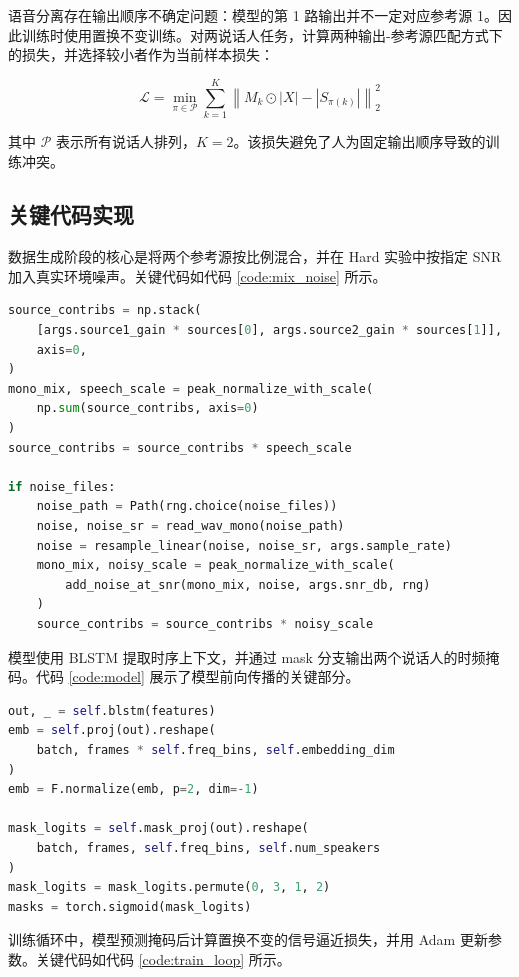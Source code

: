 语音分离存在输出顺序不确定问题：模型的第 1 路输出并不一定对应参考源 1。因此训练时使用置换不变训练\cite{yu2017pit}。对两说话人任务，计算两种输出-参考源匹配方式下的损失，并选择较小者作为当前样本损失：

\[
\mathcal{L} = \min_{\pi \in \mathcal{P}}
\sum_{k=1}^{K}
\left\|
M_k \odot |X| - |S_{\pi(k)}|
\right\|_2^2
\]

其中 $\mathcal{P}$ 表示所有说话人排列，$K=2$。该损失避免了人为固定输出顺序导致的训练冲突。

\subsection{关键代码实现}

数据生成阶段的核心是将两个参考源按比例混合，并在 Hard 实验中按指定 SNR 加入真实环境噪声。关键代码如代码 \ref{code:mix_noise} 所示。

\begin{lstlisting}[language=Python, caption={混合语音和噪声加入逻辑}, label={code:mix_noise}]
source_contribs = np.stack(
    [args.source1_gain * sources[0], args.source2_gain * sources[1]],
    axis=0,
)
mono_mix, speech_scale = peak_normalize_with_scale(
    np.sum(source_contribs, axis=0)
)
source_contribs = source_contribs * speech_scale

if noise_files:
    noise_path = Path(rng.choice(noise_files))
    noise, noise_sr = read_wav_mono(noise_path)
    noise = resample_linear(noise, noise_sr, args.sample_rate)
    mono_mix, noisy_scale = peak_normalize_with_scale(
        add_noise_at_snr(mono_mix, noise, args.snr_db, rng)
    )
    source_contribs = source_contribs * noisy_scale
\end{lstlisting}

模型使用 BLSTM 提取时序上下文，并通过 mask 分支输出两个说话人的时频掩码。代码 \ref{code:model} 展示了模型前向传播的关键部分。

\begin{lstlisting}[language=Python, caption={BLSTM 软掩码模型前向传播}, label={code:model}]
out, _ = self.blstm(features)
emb = self.proj(out).reshape(
    batch, frames * self.freq_bins, self.embedding_dim
)
emb = F.normalize(emb, p=2, dim=-1)

mask_logits = self.mask_proj(out).reshape(
    batch, frames, self.freq_bins, self.num_speakers
)
mask_logits = mask_logits.permute(0, 3, 1, 2)
masks = torch.sigmoid(mask_logits)
\end{lstlisting}

训练循环中，模型预测掩码后计算置换不变的信号逼近损失，并用 Adam 更新参数。关键代码如代码 \ref{code:train_loop} 所示。

